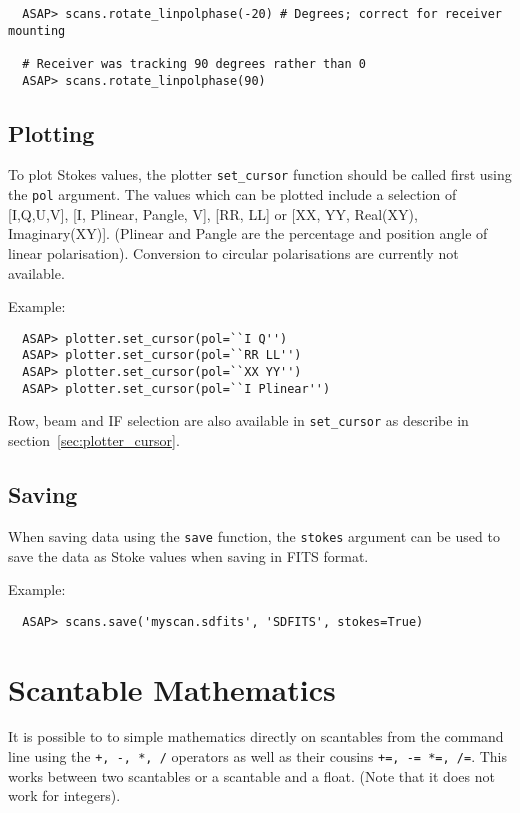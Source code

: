 \documentclass[11pt]{article}
\newcommand{\cmd}[1]{{\tt #1}}
\begin{document}
\begin{verbatim}
  ASAP> scans.rotate_linpolphase(-20) # Degrees; correct for receiver mounting

  # Receiver was tracking 90 degrees rather than 0
  ASAP> scans.rotate_linpolphase(90)
\end{verbatim}

\subsection{Plotting}
\label{sec:polplot}

To plot Stokes values, the plotter
\cmd{set\_cursor} function should be called first using the \cmd{pol}
argument. The values which can be plotted include a selection of
[I,Q,U,V], [I, Plinear, Pangle, V], [RR, LL] or [XX, YY, Real(XY),
Imaginary(XY)]. (Plinear and Pangle are the percentage and position
angle of linear polarisation). Conversion to circular polarisations
are currently not available.

Example:

\begin{verbatim}
  ASAP> plotter.set_cursor(pol=``I Q'')
  ASAP> plotter.set_cursor(pol=``RR LL'')
  ASAP> plotter.set_cursor(pol=``XX YY'')
  ASAP> plotter.set_cursor(pol=``I Plinear'')
\end{verbatim}

Row, beam and IF selection are also available in \cmd{set\_cursor} as
describe in section~\ref{sec:plotter_cursor}.

\subsection{Saving}

When saving data using the \cmd{save}
function, the \cmd{stokes} argument can be used to save the data as
Stoke values when saving in FITS format.

Example:

\begin{verbatim}
  ASAP> scans.save('myscan.sdfits', 'SDFITS', stokes=True)
\end{verbatim}


\section{Scantable Mathematics}

It is possible to to simple mathematics
directly on scantables from the command line using the \cmd{+, -, *,
/} operators as well as their cousins \cmd{+=, -= *=, /=}. This works
between two scantables or a scantable and a float. (Note that it does
not work for integers).
\end{document}
